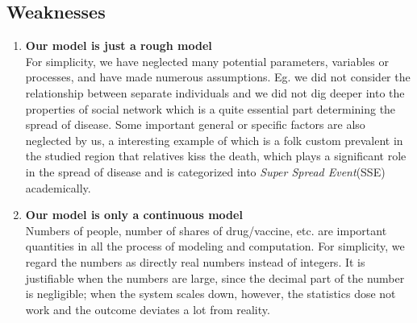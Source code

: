 \subsection{Weaknesses}
\begin{enumerate}
\item \textbf{Our model is just a rough model} \\
For simplicity, we have neglected many potential parameters, variables or processes, and have made numerous assumptions. Eg. we did not consider the relationship between separate individuals and we did not dig deeper into the properties of social network which is a quite essential part determining the spread of disease. Some important general or specific factors are also neglected by us, a interesting example of which is a folk custom prevalent in the studied region that relatives kiss the death, which plays a significant role in the spread of disease and is categorized into \emph{Super Spread Event}(SSE) academically. 

\item \textbf{Our model is only a continuous model} \\
Numbers of people, number of shares of drug/vaccine, etc. are important quantities in all the process of modeling and computation. For simplicity, we regard the numbers as directly real numbers instead of integers. It is justifiable when the numbers are large, since the decimal part of the number is negligible; when the system scales down, however, the statistics dose not work and the outcome deviates a lot from reality.
\end{enumerate}